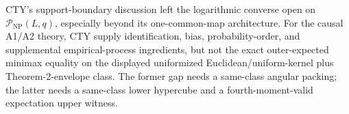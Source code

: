 CTY's support-boundary discussion left the logarithmic converse open on \(\mathcal P_{\mathrm{NP}}(L,q)\), especially beyond its one-common-map architecture.  For the causal A1/A2 theory, CTY supply identification, bias, probability-order, and supplemental empirical-process ingredients, but not the exact outer-expected minimax equality on the displayed uniformized Euclidean/uniform-kernel plus Theorem-2-envelope class.  The former gap needs a same-class angular packing; the latter needs a same-class lower hypercube and a fourth-moment-valid expectation upper witness.